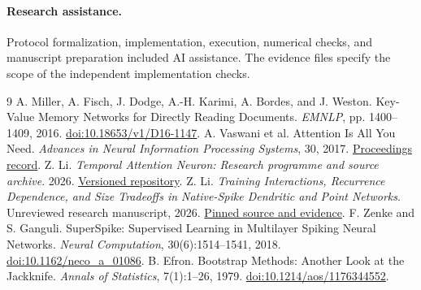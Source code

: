 \documentclass[10pt]{article}
\newcommand{\repo}{https://github.com/20171806011/Temporal-Attention-Neuron}
\begin{document}
\paragraph{Research assistance.}
Protocol formalization, implementation, execution, numerical checks, and manuscript preparation included AI assistance. The evidence files specify the scope of the independent implementation checks.

\begin{thebibliography}{9}
 A. Miller, A. Fisch, J. Dodge, A.-H. Karimi, A. Bordes, and J. Weston. Key-Value Memory Networks for Directly Reading Documents. \emph{EMNLP}, pp. 1400--1409, 2016. \href{https://doi.org/10.18653/v1/D16-1147}{doi:10.18653/v1/D16-1147}.
 A. Vaswani et al. Attention Is All You Need. \emph{Advances in Neural Information Processing Systems}, 30, 2017. \href{https://proceedings.neurips.cc/paper/2017/hash/3f5ee243547dee91fbd053c1c4a845aa-Abstract.html}{Proceedings record}.
 Z. Li. \emph{Temporal Attention Neuron: Research programme and source archive}. 2026. \href{\repo}{Versioned repository}.
 Z. Li. \emph{Training Interactions, Recurrence Dependence, and Size Tradeoffs in Native-Spike Dendritic and Point Networks}. Unreviewed research manuscript, 2026. \href{\repo/tree/7dcddee41490d8d917936891989eeb7ddb67e0da/papers/native-spike-populations-2026}{Pinned source and evidence}.
 F. Zenke and S. Ganguli. SuperSpike: Supervised Learning in Multilayer Spiking Neural Networks. \emph{Neural Computation}, 30(6):1514--1541, 2018. \href{https://doi.org/10.1162/neco_a_01086}{doi:10.1162/neco\_a\_01086}.
 B. Efron. Bootstrap Methods: Another Look at the Jackknife. \emph{Annals of Statistics}, 7(1):1--26, 1979. \href{https://doi.org/10.1214/aos/1176344552}{doi:10.1214/aos/1176344552}.
\end{thebibliography}
\end{document}

